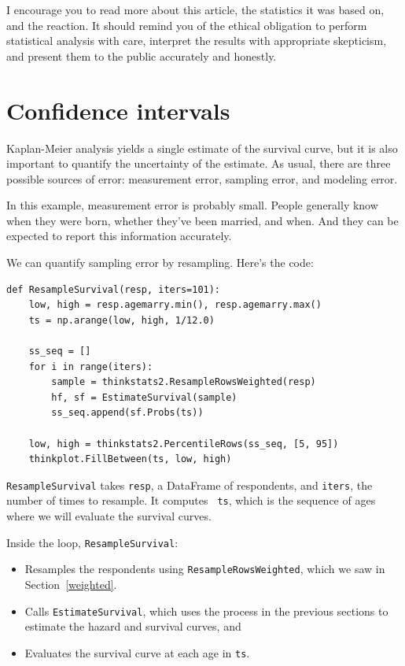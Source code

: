 \documentclass[12pt]{book}
\begin{document}
I encourage you to read more about this article, the statistics it was
based on, and the reaction.  It should remind you of the ethical
obligation to perform statistical analysis with care, interpret the
results with appropriate skepticism, and present them to the public
accurately and honestly.


\section{Confidence intervals}

Kaplan-Meier analysis yields a single estimate of the survival curve,
but it is also important to quantify the uncertainty of the estimate.
As usual, there are three possible sources of error: measurement
error, sampling error, and modeling error.

In this example, measurement error is probably small.  People
generally know when they were born, whether they've been married, and
when.  And they can be expected to report this information accurately.

We can quantify sampling error by resampling.  Here's the code:

\begin{verbatim}
def ResampleSurvival(resp, iters=101):
    low, high = resp.agemarry.min(), resp.agemarry.max()
    ts = np.arange(low, high, 1/12.0)

    ss_seq = []
    for i in range(iters):
        sample = thinkstats2.ResampleRowsWeighted(resp)
        hf, sf = EstimateSurvival(sample)
        ss_seq.append(sf.Probs(ts))

    low, high = thinkstats2.PercentileRows(ss_seq, [5, 95])
    thinkplot.FillBetween(ts, low, high)
\end{verbatim}

{\tt ResampleSurvival} takes {\tt resp}, a DataFrame of respondents,
and {\tt iters}, the number of times to resample.  It computes {\tt
  ts}, which is the sequence of ages where we will evaluate the survival
curves.

Inside the loop, {\tt ResampleSurvival}:

\begin{itemize}

\item Resamples the respondents using {\tt ResampleRowsWeighted},
which we saw in Section~\ref{weighted}.

\item Calls {\tt EstimateSurvival}, which uses the process in the
previous sections to estimate the hazard and survival curves, and

\item Evaluates the survival curve at each age in {\tt ts}.

\end{itemize}
\end{document}
